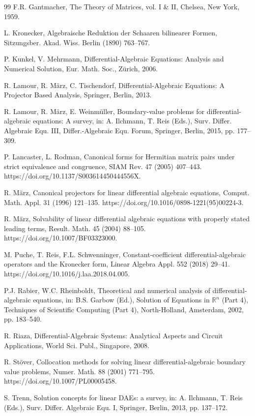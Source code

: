 \documentclass[preprint,12pt]{elsarticle}
\numberwithin{equation}{section}
\theoremstyle{definition}
\begin{document}
\begin{thebibliography}{99}
F.R. Gantmacher, The Theory of Matrices, vol. I \& II, Chelsea, New York, 1959.

L. Kronecker, Algebraische Reduktion der Schaaren bilinearer Formen, Sitzungsber. Akad. Wiss. Berlin (1890) 763–767.

P. Kunkel, V. Mehrmann, Differential-Algebraic Equations: Analysis and Numerical Solution, Eur. Math. Soc., Zürich, 2006.

R. Lamour, R. März, C. Tischendorf, Differential-Algebraic Equations: A Projector Based Analysis, Springer, Berlin, 2013.

R. Lamour, R. März, E. Weinmüller, Boundary-value problems for differential-algebraic equations: A survey, in: A. Ilchmann, T. Reis (Eds.), Surv. Differ. Algebraic Equ. III, Differ.-Algebraic Equ. Forum, Springer, Berlin, 2015, pp. 177–309.

P. Lancaster, L. Rodman, Canonical forms for Hermitian matrix pairs under strict equivalence and congruence, SIAM Rev. 47 (2005) 407–443. https://doi.org/10.1137/S003614450444556X.

R. März, Canonical projectors for linear differential algebraic equations, Comput. Math. Appl. 31 (1996) 121–135. https://doi.org/10.1016/0898-1221(95)00224-3.

R. März, Solvability of linear differential algebraic equations with properly stated leading terms, Result. Math. 45 (2004) 88–105. https://doi.org/10.1007/BF03323000.

M. Puche, T. Reis, F.L. Schwenninger, Constant-coefficient differential-algebraic operators and the Kronecker form, Linear Algebra Appl. 552 (2018) 29–41. https://doi.org/10.1016/j.laa.2018.04.005.

P.J. Rabier, W.C. Rheinboldt, Theoretical and numerical analysis of differential-algebraic equations, in: B.S. Garbow (Ed.), Solution of Equations in $\mathbb{R}^n$ (Part 4), Techniques of Scientific Computing (Part 4), North-Holland, Amsterdam, 2002, pp. 183–540.

R. Riaza, Differential-Algebraic Systems: Analytical Aspects and Circuit Applications, World Sci. Publ., Singapore, 2008.


R. Stöver, Collocation methods for solving linear differential-algebraic boundary value problems, Numer. Math. 88 (2001) 771–795. https://doi.org/10.1007/PL00005458.

S. Trenn, Solution concepts for linear DAEs: a survey, in: A. Ilchmann, T. Reis (Eds.), Surv. Differ. Algebraic Equ. I, Springer, Berlin, 2013, pp. 137–172.

\end{thebibliography}


%
%
\end{document}
